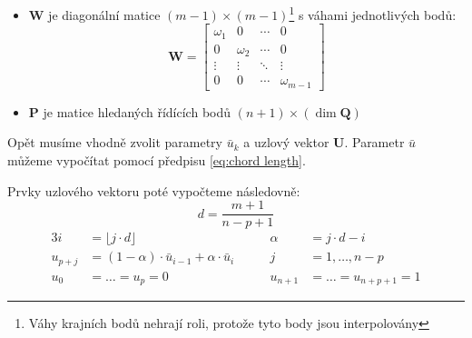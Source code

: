 \begin{itemize}
\begin{itemize}
\begin{equation}
\begin{bmatrix}
                        \end{bmatrix} \\
                    \end{equation}
                    kde
                    \begin{equation}
                        \bm{R}_k  = \bm{Q}_k - N_{0, p}(\bar{u}_k)\bm{Q}_0 - N_{n,p}(\bar{u}_k)\bm{Q}_m \quad\quad k = 1, \ldots, m -1
                    \end{equation}
              \item $\bm{W}$ je diagonální matice $(m - 1) \times (m - 1)$\footnote{Váhy
                        krajních bodů nehrají roli, protože tyto body jsou interpolovány}
                    s váhami jednotlivých bodů:
                    \begin{equation}
                        \bm{W}  = \begin{bmatrix}
                            \omega_1 & 0        & \cdots & 0            \\
                            0        & \omega_2 & \cdots & 0            \\
                            \vdots   & \vdots   & \ddots & \vdots       \\
                            0        & 0        & \cdots & \omega_{m-1}
                        \end{bmatrix}
                    \end{equation}
              \item $\bm{P}$ je matice hledaných řídících bodů $(n + 1)\times(\dim\bm{Q})$

          \end{itemize}
\end{itemize}
Opět musíme vhodně zvolit parametry $\bar{u}_k$ a uzlový vektor $\bm{U}$. Parametr $\bar{u}$
můžeme vypočítat pomocí předpisu \ref{eq:chord length}.
\par Prvky uzlového vektoru poté vypočteme následovně:
\begin{equation}
    d = \frac{m + 1}{n - p + 1}
\end{equation}
\begin{alignat}{3}
    i         & = \lfloor j \cdot d \rfloor                                 & \quad\quad \alpha    & = j \cdot d - i              \\
    u_{p + j} & = (1 - \alpha)\cdot\bar{u}_{i - 1} + \alpha \cdot \bar{u}_i & \quad\quad j         & = 1, \ldots, n - p           \\
    u_0       & = \ldots = u_p = 0 \quad\quad                               & \quad\quad u_{n + 1} & = \ldots = u_{n + p + 1} = 1
\end{alignat}
